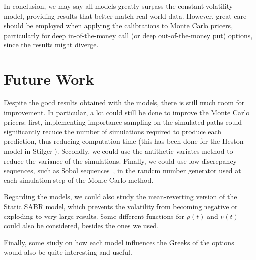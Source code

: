 In conclusion, we may say all models greatly surpass the constant volatility model, providing results that better match real world data. However, great care should be employed when applying the calibrations to Monte Carlo pricers, particularly for deep in-of-the-money call (or deep out-of-the-money put) options, since the results might diverge.


\section{Future Work}
Despite the good results obtained with the models, there is still much room for improvement. In particular, a lot could still be done to improve the Monte Carlo pricers:  first, implementing importance sampling on the simulated paths could significantly reduce the number of simulations required to produce each prediction, thus reducing computation time (this has been done for the Heston model in Stilger \citep{Stilger}). Secondly, we could use the antithetic variates method to reduce the variance of the simulations. Finally, we could use low-discrepancy sequences, such as Sobol sequences~\citep{Sobol2}, in the random number generator used at each simulation step of the Monte Carlo method.

Regarding the models, we could also study the mean-reverting version of the Static SABR model, which prevents the volatility from becoming negative or exploding to very large results. Some different functions for $\rho(t)$ and $\nu(t)$ could also be considered, besides the ones we used.


Finally, some study on how each model influences the Greeks of the options would also be quite interesting and useful.
